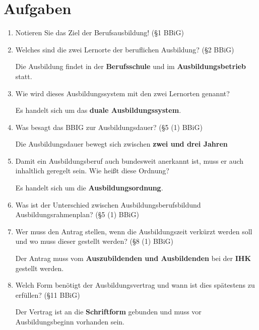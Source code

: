 \documentclass[a4paper,11pt]{scrartcl}	%
\begin{document}
\section{Aufgaben}

\begin{enumerate}
	\item Notieren Sie das Ziel der Berufsausbildung! (§1 BBiG)\par
	
	\item Welches sind die zwei Lernorte der beruflichen Ausbildung? (§2 BBiG)\par
	Die Ausbildung findet in der \textbf{Berufsschule} und im \textbf{Ausbildungsbetrieb} statt.
	\item Wie wird dieses Ausbildungssystem mit den zwei Lernorten genannt?\par
	Es handelt sich um das \textbf{duale Ausbildungssystem}.
	\item Was besagt das BBIG zur Ausbildungsdauer? (§5 (1) BBiG)\par
	Die Ausbildungsdauer bewegt sich zwischen \textbf{zwei und drei Jahren} 
	\item Damit ein Ausbildungsberuf auch bundesweit anerkannt ist, muss er auch inhaltlich geregelt sein. Wie heißt diese Ordnung?\par
	Es handelt sich um die \textbf{Ausbildungsordnung}.
	\item Was ist der Unterschied zwischen \glqq Ausbildungsberufsbild\grqq und \glqq Ausbildungsrahmenplan\grqq ? (§5 (1) BBiG)\par
	\item Wer muss den Antrag stellen, wenn die Ausbildungszeit verkürzt werden soll und wo muss dieser gestellt werden? (§8 (1) BBiG)\par
	Der Antrag muss vom \textbf{Auszubildenden und Ausbildenden} bei der \textbf{IHK} gestellt werden.
	\item Welch Form benötigt der Ausbildungsvertrag und wann ist dies spätestens zu erfüllen? (§11 BBiG)\par
	Der Vertrag ist an die \textbf{Schriftform} gebunden und muss vor Ausbildungsbeginn vorhanden sein.
	
	
\end{enumerate}
\end{document}
